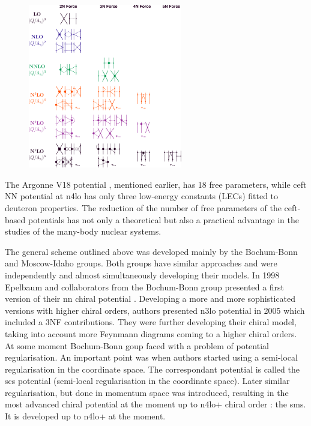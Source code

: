 \begin{figure}[h]
    \begin{center}
    \includegraphics[width=0.6\textwidth]{Figures/chiral.png}
    \end{center}
    \caption{}
    \label{chiral_diagrams}
\end{figure}

The Argonne V18 potential \cite{AV18Wiringa}, mentioned earlier, has 18 free parameters,
while \gls{ceft} NN potential at \gls{n4lo} \cite{Machleidt2011} has only three low-energy constants (LECs) fitted to deuteron properties.
The reduction of the number of free parameters of the \gls{ceft}-based potentials
has not only a theoretical but also a practical advantage in the studies of the many-body nuclear systems.

The general scheme outlined above was developed mainly by the Bochum-Bonn and Moscow-Idaho groups.
Both groups have similar approaches and were independently and almost simultaneously
developing their models. In 1998 Epelbaum and collaborators from the Bochum-Bonn group 
presented a first version of their \gls{nn} chiral potential \cite{EPELBAOUM1998107, epelbaum2000two}.
Developing a more and more sophisticated versions with higher chiral orders, authors presented
\gls{n3lo} potential in 2005 \cite{epelbaum2005two} which included a 3NF contributions.
They were further developing their chiral model, taking into account more Feynmann diagrams
coming to a higher chiral orders.
At some moment Bochum-Bonn goup faced with a problem of potential regularisation\cite{skibinski_3H, Witala_2014}.
An important point was when authors started using a semi-local regularisation 
in the coordinate space. The correspondant potential is called  the \gls{scs} potential
(semi-local regularisation in the coordinate space)\cite{Epelbaum2014SCS}. Later similar regularisation,
but done in momentum space was introduced, resulting in the most advanced chiral potential at the moment up to  
\gls{n4lo+} chiral order \cite{reinkrebs2018}: the \gls{sms}. It is developed up to \gls{n4lo+} at the moment.

